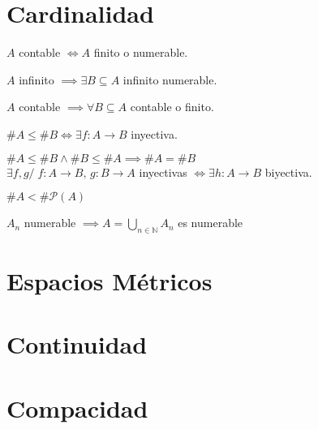 \documentclass{article}
\begin{document}
\section{Cardinalidad}
\begin{definicion}[Contable]
    $A$ contable $\iff A$ finito o numerable.
\end{definicion}
\begin{teorema}
    $A$ infinito $\implies \exists B \subseteq A$ infinito numerable.
\end{teorema}
\begin{teorema}
    $A$ contable $\implies \forall B \subseteq A$ contable o finito.
\end{teorema}
\begin{definicion}
    $\#A \leq \#B \iff \exists f : A \rightarrow B$ inyectiva.
\end{definicion}
\begin{teorema}
    $\#A \leq \#B \land \#B \leq \#A \implies \#A = \#B$\\
    $\exists f,g /\; f: A \rightarrow B,\, g: B \rightarrow A$ inyectivas $\iff \exists h : A \rightarrow B$ biyectiva.
\end{teorema}
\begin{teorema}[Cantor]
    $\#A < \#\mathcal{P}(A)$
\end{teorema}
\begin{teorema}
    $A_n$ numerable $\implies A = \bigcup_{n\in\mathbb{N}} A_n$ es numerable
\end{teorema}

\section{Espacios M\'etricos}

\section{Continuidad}

\section{Compacidad}
\end{document}
